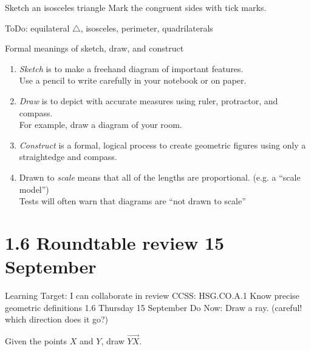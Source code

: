 \begin{frame}{ Sketch an isosceles triangle}
  Mark the congruent sides with tick marks.\par \vspace{4cm}
  ToDo: equilateral $\triangle$, isosceles, perimeter, quadrilaterals
\end{frame}

\begin{frame}{Formal meanings of sketch, draw, and construct}
  \begin{enumerate}
    \item \emph{Sketch} is to make a freehand diagram of important features. \\[0.15cm]
    Use a pencil to write carefully in your notebook or on paper.  \smallskip
    \item \emph{Draw}  is to depict with accurate measures using ruler, protractor, and compass.\\[0.15cm]
    For example, draw a diagram of your room. \smallskip
    \item \emph{Construct} is a formal, logical process to create geometric figures using only a straightedge and compass. \smallskip
    \item Drawn to \emph{scale} means that all of the lengths are proportional. (e.g. a ``scale model'')\\[0.15cm]
    Tests will often warn that diagrams are ``not drawn to scale''
  \end{enumerate}
\end{frame}

\section{1.6 Roundtable review \hfill 15 September}
\begin{frame}{Learning Target: I can collaborate in review}
  {CCSS: HSG.CO.A.1 Know precise geometric definitions  \hfill \alert{1.6 Thursday 15 September}}
  Do Now: Draw a ray. (careful! which direction does it go?) \par
  Given the points $X$ and $Y$, draw $\overrightarrow{YX}$.
  \vspace{2cm}
  \begin{center}
  \end{center} \vspace{1cm}
\end{frame}

